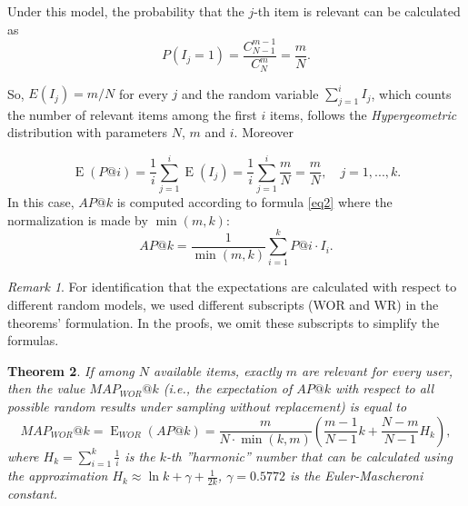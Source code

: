 \documentclass{tpms-l}
\newtheorem{theorem}{Theorem}[section]
\theoremstyle{definition}
\theoremstyle{remark}
\newtheorem{remark}[theorem]{Remark}
\numberwithin{equation}{section}
\begin{document}
Under this model, the probability that the $j$-th item is relevant can be calculated as
\[
P (I_j = 1) =\frac{C_{N-1}^{m-1}}{C_N^m}=\frac{m}{N}.
\]


So,  $E(I_j) = m/N$ for every $j$ and the random variable $\sum_{j=1}^iI_j$, which counts the number of relevant items among the first $i$ items,  follows the \textit{Hypergeometric} distribution with parameters $N$, $m$ and $i$. Moreover 

$$\operatorname{E}(P@i)=\frac{1}{i}\sum_{j=1}^i\operatorname{E} (I_j)= \frac{1}{i}\sum_{j=1}^i \frac{m}{N}=\frac{m}{N}, \quad j=1,..., k.$$
In this case, $AP@k$ is computed according to formula \eqref{eq2} where the normalization is made by $\min(m,k)$:
$$AP@k=\frac{1}{\min(m,k)}\sum_{i=1}^k P@i\cdot I_{i}.$$

\begin{remark}
    For identification that the expectations are calculated with respect to different random models,  we used different subscripts (WOR and WR) in the theorems' formulation. In the proofs, we omit these subscripts to simplify the formulas. 
\end{remark}

\begin{theorem}\label{th1wor} If among  $N$ available items, exactly $m$ are relevant for every user,  then the value $MAP_{WOR}@k$ (i.e., the expectation of $AP@k$ with respect to all possible random results under sampling without replacement) is equal to
\begin{equation}
MAP_{WOR}@k= \operatorname{E}_{WOR} (AP@k) =\frac{m}{N\cdot \min (k,m)}\left(\frac{m-1}{N-1}k+\frac {N-m}{N-1} H_k\right),
\end{equation}
where $H_k=\sum_{i=1}^k\frac1i$ is the $k$-th ''harmonic'' number that can be calculated using the approximation $H_k\approx \ln k+\gamma+\frac1{2k}$, $\gamma=0.5772$ is the Euler-Mascheroni constant.
\end{theorem}
\end{document}
